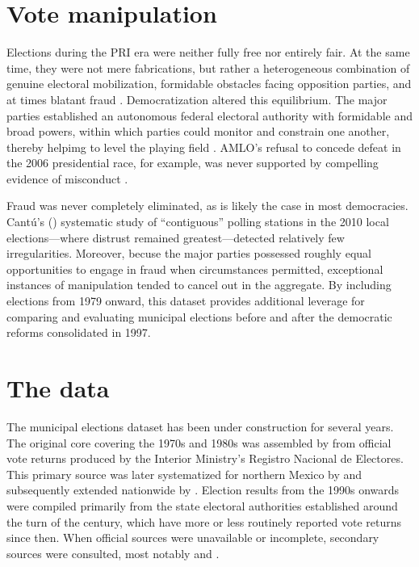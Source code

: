 \documentclass[letter,12pt]{article}
\begin{document}
\section{Vote manipulation}
Elections during the PRI era were neither fully free nor entirely fair. At the same time, they were not mere fabrications, but rather a heterogeneous combination of genuine electoral mobilization, formidable obstacles facing opposition parties, and at times blatant fraud \citep{molinar.1991a, cantuCSG2019apsr,magaloni.2006}. Democratization altered this equilibrium. The major parties established an autonomous federal electoral authority with formidable and broad powers, within which parties could monitor and constrain one another, thereby helpimg to level the playing field \citep{estevez.magar.rosas.2008}. AMLO's refusal to concede defeat in the 2006 presidential race, for example, was never supported by compelling evidence of misconduct \citep{klesner.FCHelections.2007}.

Fraud was never completely eliminated, as is likely the case in most democracies. Cantú's (\citeyear{cantuContiguas2014ajps}) systematic study of ``contiguous'' polling stations in the 2010 local elections---where distrust remained greatest---detected relatively few irregularities. Moreover, becuse the major parties possessed roughly equal opportunities to engage in fraud when circumstances permitted, exceptional instances of manipulation tended to cancel out in the aggregate. By including elections from 1979 onward, this dataset provides additional leverage for comparing and evaluating municipal elections before and after the democratic reforms consolidated in 1997.

\section{The data}

The municipal elections dataset has been under construction for several years. The original core covering the 1970s and 1980s was assembled by \citet{molinar.1991a} from official vote returns produced by the Interior Ministry's Registro Nacional de Electores. This primary source was later systematized for northern Mexico by \citet{magar.1994} and subsequently extended nationwide by \citet{varela.2004}. Election results from the 1990s onwards were compiled primarily from the state electoral authorities established around the turn of the century, which have more or less routinely reported vote returns since then. When official sources were unavailable or incomplete, secondary sources were consulted, most notably \citet{revista.voz.y.voto} and \citet{cede.uam.izt}.
\end{document}

